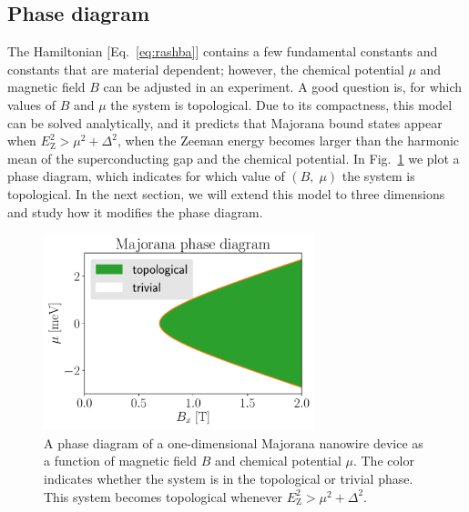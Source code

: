 \subsection{Phase diagram}
The Hamiltonian [Eq.~\eqref{eq:rashba}] contains a few fundamental constants and constants that are material dependent; however, the chemical potential $\mu$ and magnetic field $B$ can be adjusted in an experiment.
A good question is, for which values of $B$ and $\mu$ the system is topological.
Due to its compactness, this model can be solved analytically, and it predicts that Majorana bound states appear when $E_\textrm{Z}^{2}>\mu^{2}+\Delta^{2}$, when the Zeeman energy becomes larger than the harmonic mean of the superconducting gap and the chemical potential.
In Fig.~\ref{fig:phase_diagram_1D} we plot a phase diagram, which indicates for which value of $\left(B,\; \mu\right)$ the system is topological.
In the next section, we will extend this model to three dimensions and study how it modifies the phase diagram.

\begin{figure}
\begin{center}
\includegraphics[width=0.7\textwidth]{chapter_introduction/figures/phase_diagram_1D.pdf}
\caption{A phase diagram of a one-dimensional Majorana nanowire device as a function of magnetic field $B$ and chemical potential $\mu$.
The color indicates whether the system is in the topological or trivial phase.
This system becomes topological whenever $E_\textrm{Z}^{2}>\mu^{2}+\Delta^{2}$.
\label{fig:phase_diagram_1D}}
\end{center}
\end{figure}




